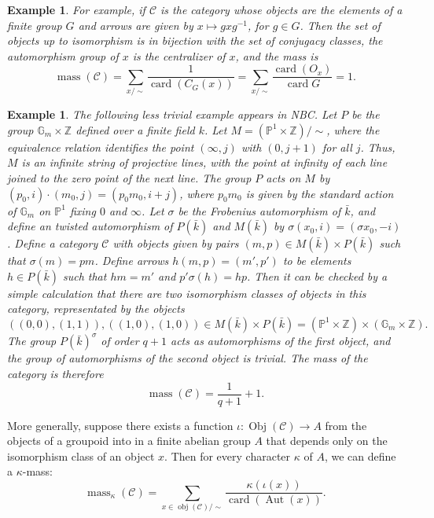 \documentclass[brochure,english,12pt]{bourbaki}
\newtheorem{example}[equation]{Example}
\def\op#1{{\operatorname{#1}}}
\newcommand{\ring}[1]{\mathbb{#1}}
\def\mass{\op{mass}}
\def\card{\op{card}}
\def\C{{\mathcal C}}
\begin{document}
\begin{example}
For example, if ${\C}$ is the category whose objects are the elements of a finite group $G$
and arrows are given by $x \mapsto g x g^{-1}$, for $g\in G$.  Then the set of objects up to
isomorphism is in bijection with the set of conjugacy classes, the automorphism group of $x$ is the
centralizer of $x$,  and the mass is
\[
\mass(\C) = \sum_{x/\sim} \frac{1}{\op{card}(C_G(x))} = 
\sum_{x/\sim} \frac{\op{card}(O_x)}{\card{G}} = 1.
\]
\end{example}

\begin{example}
The following less trivial example appears in NBC.  Let $P$ be the
group $\ring{G}_m\times \ring{Z}$ defined over a finite field $k$.
Let $M = (\ring{P}^1\times\ring{Z})/\sim$, where the equivalence
relation identifies the point $(\infty,j)$ with $(0,j+1)$   for all $j$.
Thus, $M$ is an infinite string of projective lines, with the point at infinity of each line joined to the
zero point of the next line.  The group $P$ acts on $M$ by $(p_0,i)\cdot
(m_0,j) = (p_0 m_0,i+j)$, where $p_0m_0$ is given by the standard action of
$\ring{G}_m$ on $\ring{P}^1$ fixing $0$ and $\infty$.  
Let $\sigma$ be the Frobenius automorphism
of $\bar k$, and define an twisted automorphism of $P(\bar k)$ and $M(\bar k)$
by $\sigma(x_0,i) = (\sigma x_0,-i)$.  Define a category $\mathcal C$ with
objects given by pairs $(m,p)\in M(\bar k)\times P(\bar k)$ such that $\sigma(m) = p
m$.  Define  arrows $h(m,p) = (m',p')$ to be elements $h\in P(\bar k)$ such
that $hm = m'$ and $p'\sigma(h) = h p$.  Then it can be checked by a simple
calculation that there are two isomorphism classes of objects in this
category, representated by the objects
\[
((0,0),(1,1)), ((1,0),(1,0))\in M(\bar k)\times P(\bar k) = 
(\ring{P}^1\times\ring{Z}) \times (\ring{G}_m\times\ring{Z}).
\]
The group $P(\bar k)^\sigma$ of order $q+1$ acts as automorphisms of the first object,
and the group of automorphisms of the second object is trivial.  The mass of the category
is therefore
\[
\mass(\C) = \frac{1}{q+1} + 1.
\]
\end{example}

More generally, suppose there exists a function $\iota:\op{Obj}(\C)\to  A$ from the objects
of a groupoid into in a finite abelian group $A$ that
depends only on the isomorphism class of an object $x$.  Then for every
character $\kappa$ of $A$, we can define a $\kappa$-mass:
\[
\mass_\kappa(\C)= \sum_{x\in \op{obj}(\C)/\sim} \frac{\kappa(\iota(x))}{\op{card}(\op{Aut}(x))}.
\]
\end{document}
